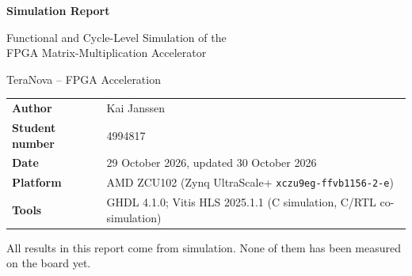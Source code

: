 \documentclass[11pt,a4paper]{article}
\newcommand{\code}[1]{\texttt{#1}}
\begin{document}
\begin{titlepage}
\centering
\vspace*{3cm}
{\LARGE\bfseries Simulation Report\par}
\vspace{0.5cm}
{\Large Functional and Cycle-Level Simulation of the\\FPGA Matrix-Multiplication Accelerator\par}
\vspace{0.3cm}
{\large TeraNova -- FPGA Acceleration\par}
\vspace{2cm}
\begin{tabular}{@{}ll@{}}
\textbf{Author}          & Kai Janssen \\
\textbf{Student number}  & 4994817 \\
\textbf{Date}            & 29 October 2026, updated 30 October 2026 \\
\textbf{Platform}        & AMD ZCU102 (Zynq UltraScale+ \code{xczu9eg-ffvb1156-2-e}) \\
\textbf{Tools}           & GHDL 4.1.0; Vitis HLS 2025.1.1 (C simulation, C/RTL co-simulation) \\
\end{tabular}
\vfill
{\small All results in this report come from simulation. None of them has been measured on the board yet.\par}
\end{titlepage}
\end{document}
